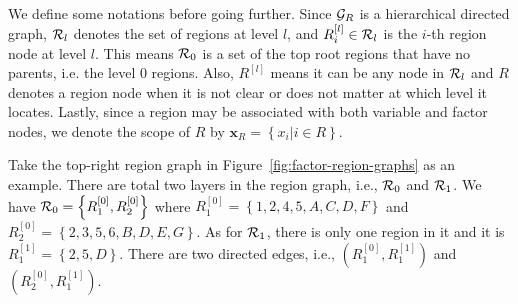We define some notations before going further. Since $\mathcal{G}_R$ is a hierarchical directed graph, $\mathcal{R}_l$ denotes the set of regions at level $l$, and
$R^{[l]}_i\in \mathcal{R}_l$ is the $i$-th region node at level $l$. This means $\mathcal{R}_0$ is a set of the top root regions that have no parents, i.e. the level $0$ regions. Also, $R^{[l]}$ means it can be any node in $\mathcal{R}_l$ and $R$ denotes a region node when it is not clear or does not matter at which level it locates. Lastly, since a region may be associated with both variable and factor nodes, we denote the scope of $R$ by  $\bm{x}_R = \left\{ x_i| i \in R \right\}$.

\begin{example}
  Take the top-right region graph in Figure~\ref{fig:factor-region-graphs} as an example. There are total two layers in the region graph, i.e., $\mathcal{R}_0$ and $\mathcal{R}_1$. We have $\mathcal{R}_0 = \left\{ R_1^{[0]}, R_2^{[0]} \right\}$ where $R_1^{[0]} = \left\{ 1, 2, 4, 5, A, C, D, F \right\}$ and $R_2^{[0]} = \left\{ 2, 3, 5, 6, B, D, E, G \right\}$. As for $\mathcal{R}_1$, there is only one region in it and it is $R_1^{[1]} = \left\{ 2, 5, D \right\}$. There are two directed edges, i.e., $\left( R_1^{[0]}, R_1^{[1]} \right)$ and $\left( R_2^{[0]}, R_1^{[1]} \right)$.
\end{example}

